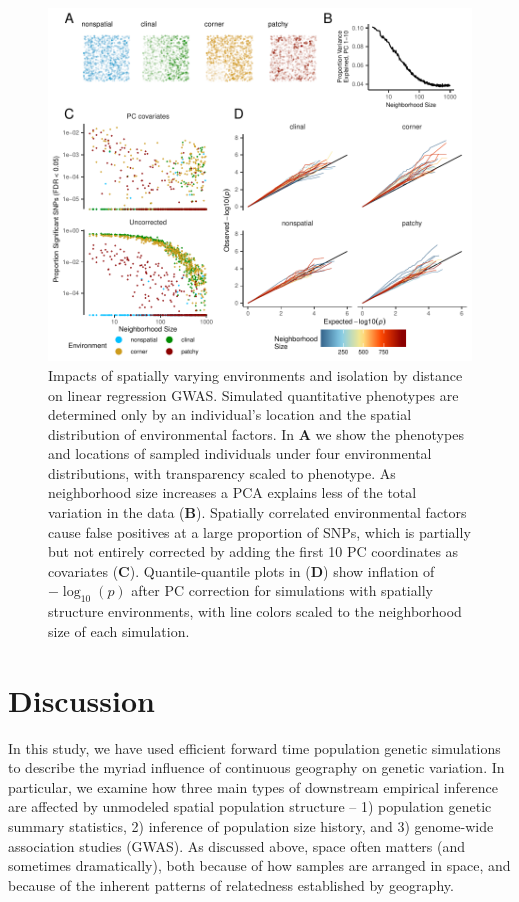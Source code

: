 \documentclass[10pt,twoside,lineno,hidelinks]{preprint}
\begin{document}
\begin{figure}[p]
\centering
\includegraphics[width=\textwidth]{figures/gwas_summary_loglog_qqlines.pdf}
    \caption{Impacts of spatially varying environments and isolation by distance on linear regression GWAS. Simulated quantitative phenotypes are determined only by an individual's location and the spatial distribution of environmental factors. In \textbf{A} we show the phenotypes and locations of sampled individuals under four environmental distributions, with transparency scaled to phenotype. As neighborhood size increases a PCA explains less of the total variation in the data (\textbf{B}). Spatially correlated environmental factors cause false positives at a large proportion of SNPs, which is partially but not entirely corrected by adding the first 10 PC coordinates as covariates (\textbf{C}). Quantile-quantile plots in (\textbf{D}) show inflation of $-\log_{10}(p)$ after PC correction for simulations with spatially structure environments, with line colors scaled to the neighborhood size of each simulation.
}
\label{fig:gwas}
\end{figure}

\section{Discussion}

In this study,
we have used efficient forward time population genetic simulations 
to describe the myriad influence of continuous geography on genetic variation. 
In particular, we examine how three main types of downstream empirical inference are affected by unmodeled spatial population structure
-- 1) population genetic summary statistics, 2) inference of population size history, and 3) genome-wide association studies (GWAS). 
As discussed above, 
space often matters (and sometimes dramatically),
both because of how samples are arranged in space, and because of the inherent patterns of relatedness established by geography.
\end{document}
